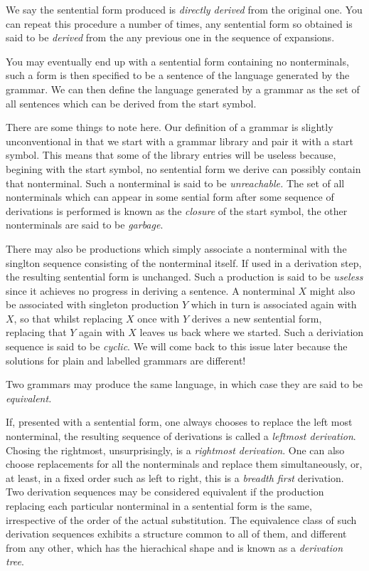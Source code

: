 \documentclass[oneside]{book}
\begin{document}
We say the sentential form produced is {\em directly derived} from
the original one. You can repeat this procedure a number of times,
any sentential form so obtained is said to be {\em derived} from the
any previous one in the sequence of expansions.

You may eventually end up with a sentential form containing no
nonterminals, such a form is then specified to be a sentence
of the language generated by the grammar. We can then define
the language generated by a grammar as the set of all sentences
which can be derived from the start symbol.

There are some things to note here. Our definition of a grammar
is slightly unconventional in that we start with a grammar library
and pair it with a start symbol. This means that some of the 
library entries will be useless because, begining with the start 
symbol, no sentential form we derive can possibly contain that
nonterminal. Such a nonterminal is said to be {\em unreachable.}
The set of all nonterminals which can appear in some sential form
after some sequence of derivations is performed is known as the
{\em closure} of the start symbol, the other nonterminals
are said to be {\em garbage}.

There may also be productions which simply associate a nonterminal
with the singlton sequence consisting of the nonterminal itself.
If used in a derivation step, the resulting sentential form
is unchanged. Such a production is said to be {\em useless} 
since it achieves no progress in deriving a sentence. A nonterminal
$X$ might also be associated with singleton production $Y$ which
in turn is associated again with $X$, so that whilst replacing
$X$ once with $Y$ derives a new sentential form, replacing that
$Y$ again with $X$ leaves us back where we started. Such a
deriviation sequence is said to be {\em cyclic}. We will come back
to this issue later because the solutions for plain and labelled
grammars are different!

Two grammars may produce the same language, in which case
they are said to be {\em equivalent.}

If, presented with a sentential form, one always chooses to
replace the left most nonterminal, the resulting sequence
of derivations is called a {\em leftmost derivation}. Chosing
the rightmost, unsurprisingly, is a {\em rightmost derivation}.
One can also choose replacements for all the nonterminals
and replace them simultaneously, or, at least, in a fixed
order such as left to right, this is a {\em breadth first}
derivation. Two derivation sequences may be considered
equivalent if the production replacing each particular
nonterminal in a sentential form is the same, irrespective
of the order of the actual substitution. The equivalence
class of such derivation sequences exhibits a structure
common to all of them, and different from any other,
which has the hierachical shape and is known as a 
{\em derivation tree}.
\end{document}
